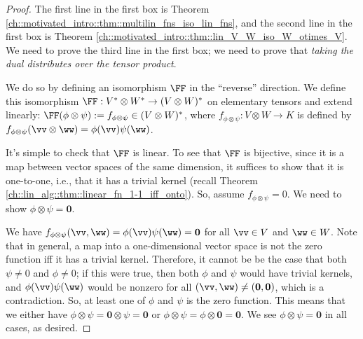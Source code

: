 \begin{proof}
    The first line in the first box is Theorem \ref{ch::motivated_intro::thm::multilin_fns_iso_lin_fns}, and the second line in the first box is Theorem \ref{ch::motivated_intro::thm::lin_V_W_iso_W_otimes_V}. We need to prove the third line in the first box; we need to prove that \textit{taking the dual distributes over the tensor product}.
    
    We do so by defining an isomorphism $\FF$ in the ``reverse'' direction. We define this isomorphism ${\FF:V^* \otimes W^* \rightarrow (V \otimes W)^*}$ on elementary tensors and extend linearly: $\FF(\phi \otimes \psi) := f_{\phi \otimes \psi} \in (V \otimes W)^*$, where $f_{\phi \otimes \psi}:V \otimes W \rightarrow K$ is defined by $f_{\phi \otimes \psi}(\vv \otimes \ww) = \phi(\vv) \psi(\ww)$.

    It's simple to check that $\FF$ is linear. To see that $\FF$ is bijective, since it is a map between vector spaces of the same dimension, it suffices to show that it is one-to-one, i.e., that it has a trivial kernel (recall Theorem \ref{ch::lin_alg::thm::linear_fn_1-1_iff_onto}). So, assume $f_{\phi \otimes \psi} = 0$. We need to show $\phi \otimes \psi = \mathbf{0}$.
    
    We have $f_{\phi \otimes \psi}(\vv, \ww) = \phi(\vv) \psi(\ww) = \mathbf{0}$ for all $\vv \in V$ and $\ww \in W$. Note that in general, a map into a one-dimensional vector space is not the zero function iff it has a trivial kernel. Therefore, it cannot be be the case that both $\psi \neq 0$ and $\phi \neq 0$; if this were true, then both $\phi$ and $\psi$ would have trivial kernels, and $\phi(\vv) \psi(\ww)$ would be nonzero for all $(\vv, \ww) \neq (\mathbf{0}, \mathbf{0})$, which is a contradiction. So, at least one of $\phi$ and $\psi$ is the zero function. This means that we either have $\phi \otimes \psi = \mathbf{0} \otimes \psi = \mathbf{0}$ or $\phi \otimes \psi = \phi \otimes \mathbf{0} = \mathbf{0}$. We see $\phi \otimes \psi = \mathbf{0}$ in all cases, as desired.
\end{proof}

